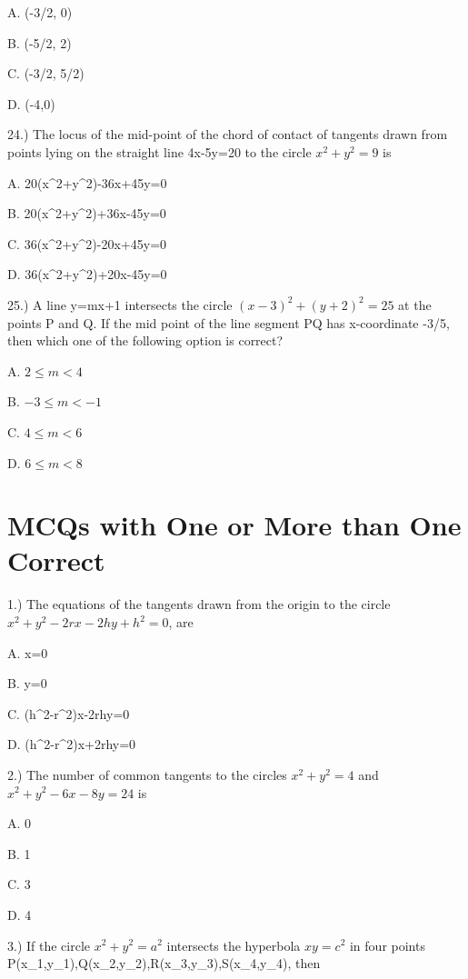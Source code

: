 \documentclass{article}
\begin{document}
\choice  A. (-3/2, 0)

\choice  B. (-5/2, 2)

\choice  C. (-3/2, 5/2)

\choice  D. (-4,0)

\vspace{5mm}
24.) The locus of the mid-point of the chord of contact of tangents drawn from points lying on the straight line 4x-5y=20 to the circle $x^2+y^2=9$ is

\choice  A. 20(x^2+y^2)-36x+45y=0

\choice  B. 20(x^2+y^2)+36x-45y=0

\choice  C. 36(x^2+y^2)-20x+45y=0

\choice  D. 36(x^2+y^2)+20x-45y=0

\vspace{5mm}
25.) A line y=mx+1 intersects the circle $(x-3)^2+(y+2)^2= 25$ at the points P and Q. If the mid point of the line segment PQ has x-coordinate -3/5, then which one of the following option is correct?

\choice  A. $  2 \leq m <  4 $

\choice  B. $ -3 \leq m < -1 $

\choice  C. $  4 \leq m <  6 $

\choice  D. $  6 \leq m <  8$

\section{MCQs with One or More than One Correct}
\vspace{5mm}
1.) The equations of the tangents drawn from the origin to the circle  $x^2+y^2-2rx-2hy+h^2=0$, are

\choice  A. x=0

\choice  B. y=0

\choice  C. (h^2-r^2)x-2rhy=0

\choice  D. (h^2-r^2)x+2rhy=0

\vspace{5mm}
2.) The number of common tangents to the circles $x^2+y^2=4$ and $x^2+y^2-6x-8y=24$ is

\choice  A. 0

\choice  B. 1

\choice  C. 3

\choice  D. 4

\vspace{5mm}
3.) If the circle $x^2+y^2=a^2$ intersects the hyperbola $xy=c^2$ in four points P(x_1,y_1),Q(x_2,y_2),R(x_3,y_3),S(x_4,y_4), then
\end{document}
